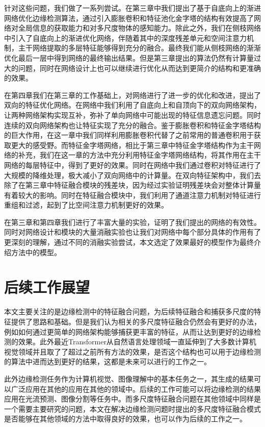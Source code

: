 \documentclass[master]{thesis-uestc}
\begin{document}
针对这些问题，我们做了一系列尝试。在第三章中我们提出了基于自底向上的渐进网络优化边缘检测算法，通过引入膨胀卷积和特征池化金字塔的结构有效提高了网络对全局信息的获取能力和对多尺度物体的感知能力。除此之外，我们在侧枝网络中引入了自底向上的渐进优化网络，伴随着其中的深度残差单元和空间注意力机制，主干网络提取的多层特征能够得到充分的融合。最终我们能从侧枝网络的渐渐优化最后一层中得到网络的最终输出结果。但是第三章提出的算法仍然有计算量过大的问题，同时在网络设计上也可以继续进行优化从而达到更简介的结构和更准确的效果。

在第四章我们在第三章的工作基础上，对网络进行了进一步的优化和改进，提出了双向的特征优化网络。在网络中我们利用了自底向上和自顶向下的双向网络架构，让两种网络架构实现互补，弥补了单向网络中可能出现的特征信息遗忘问题。同时连续的双向网络架构也让特征实现了充分的融合。鉴于膨胀卷积和特征金字塔结构的巨大作用，在这一章中我们同样利用膨胀卷积代替了之前常用的普通卷积用于获取更大的感受野。而特征金字塔网络，相比于第三章中特征金字塔结构作为主干网络的补充，我们在这一章的方法中充分利用特征金字塔网络结构，将其作用在主干网络的每层特征中，得到了更好的效果。同时在网络中我们通过卷积对特征进行了大规模的降维处理，极大减小了双向网络中的计算量。在双向特征架构中，我们去除了在第三章中特征融合模块的残差块，因为经过实验证明残差块会对整体计算量有着较大的影响。同时在特征融合模块中，我们利用了通道注意力机制对特征进行重组和过滤，起到了比空间注意力机制更好的效果。

在第三章和第四章我们进行了丰富大量的实验，证明了我们提出的网络的有效性。同时对网络设计和模块的大量消融实验也让我们对网络中每个部分具体的作用有了更深刻的理解，通过不同的消融实验尝试，本文选定了效果最好的模型作为最终介绍方法中的模型。

\section{后续工作展望}
本文主要关注的是边缘检测中的特征融合问题，为后续特征融合和捕获多尺度的特征提供了思路和基础。但是我们认为相关的多尺度特征融合仍然会有更好的办法，例如如何通过更简单的网络架构能够捕获更丰富的特征，从而让达到更好的边缘检测的效果。此外最近Transformer从自然语言处理领域一直延伸到了大多数计算机视觉领域并且取了了超过之前所有方法的效果，是否这个结构也可以用于边缘检测的算法中进而达到更好的结果，这都是未来可以进行的工作之一。

此外边缘检测任务作为计算机视觉、图像理解中的基本任务之一，其生成的结果可以广泛应用在其他的应用在其他的领域中。后续的工作可能可以将边缘检测的结果应用在光流预测、图像分割等任务中。而多尺度特征融合问题在其他领域中同样是一个需要主要研究的问题，本文在解决边缘检测问题时提出的多尺度特征融合模式是否能够在其他领域的方法中取得良好的效果，也可以作为后续的工作之一。
\end{document}
